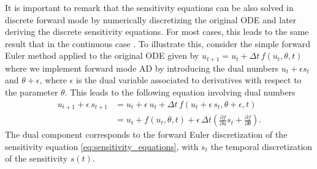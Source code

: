 It is important to remark that the sensitivity equations can be also solved in discrete forward mode by numerically discretizing the original ODE and later deriving the discrete sensitivity equations. 
For most cases, this leads to the same result that in the continuous case \cite{FATODE2014}.
To illustrate this, consider the simple forward Euler method applied to the original ODE given by $u_{t+1} = u_t + \Delta t \, f(u_t, \theta, t)$ where we implement forward mode AD by introducing the dual numbers $u_t + \epsilon s_t$ and $\theta + \epsilon$, where $\epsilon$ is the dual variable associated to derivatives with respect to the parameter $\theta$.
This leads to the following equation involving dual numbers
\begin{align}
    u_{t+1} + \epsilon \, s_{t+1}
    &= 
    u_t + \epsilon \, u_t + \Delta t \, f (u_t + \epsilon \, s_t, \theta + \epsilon, t) \nonumber \\
    &= 
    u_t + f(u_t, \theta, t) 
    + 
    \epsilon \, \Delta t 
    \left( 
    \frac{\partial f}{\partial u} s_t + 
    \frac{\partial f}{\partial \theta}
    \right).
    \label{eq:sensitivity-equation-AD}
\end{align}
The dual component corresponds to the forward Euler discretization of the sensitivity equation \eqref{eq:sensitivity_equations}, with $s_t$ the temporal discretization of the sensitivity $s(t)$.


